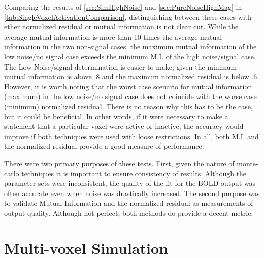 Comparing the results of \autoref{sec:SimHighNoise} and \autoref{sec:PureNoiseHighMag}
in \autoref{tab:SingleVoxelActivationComparison},
distinguishing between these cases with ether normalized residual or mutual information
is not clear cut. While the average mutual information is more than 10 times
the average mutual information in the two non-signal cases, the maximum
mutual information of the low noise/no signal case exceeds the minimum M.I. of the high noise/signal
case. The Low Noise/signal determination is easier to make; given
the minimum mutual information is above $.8$ and the maximum normalized residual is below $.6$.
However, it is worth noting that the worst case scenario  for mutual information (maximum) in the
low noise/no signal case does not coincide with the worse case (minimum) normalized residual.
There is no reason why this has to be the case, but it could be beneficial. In
other words, if it were necessary to make a statement that
a particular voxel were active or inactive; the accuracy would improve if both techniques
were used with loose restrictions. In all, both M.I. and the normalized residual
provide a good measure of performance.

There were two primary purposes of these tests. First, given the nature of monte-carlo
techniques it is important to ensure consistency of results. Although the parameter
sets were inconsistent, the quality of the fit for the BOLD output was often
accurate even when noise was drastically increased. The second purpose was to validate
Mutual Information and the normalized residual as measurements of output quality.
Although not perfect, both methods do provide a decent metric.

\section{Multi-voxel Simulation}
\label{sec:Multi-voxel Simulation}

